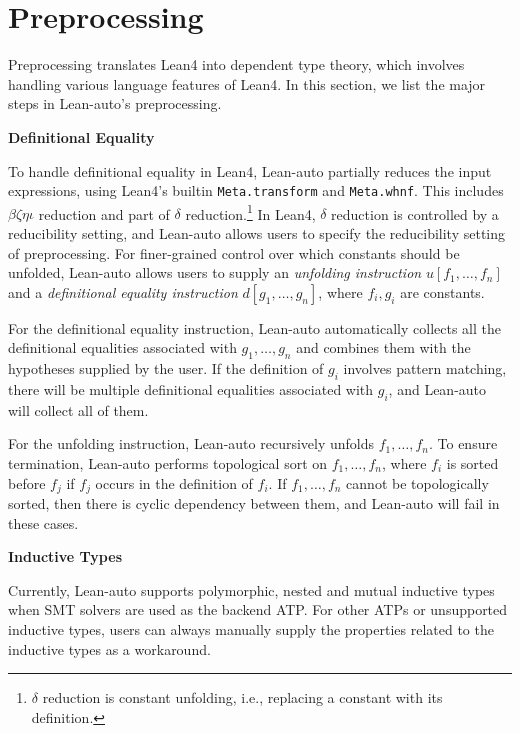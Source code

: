 \section{Preprocessing}\label{sectprep}

  Preprocessing translates Lean4 into dependent type theory, which involves
  handling various language features of Lean4. In this section, we list the major steps
  in Lean-auto's preprocessing.


\noindent \textbf{Definitional Equality}

  To handle definitional equality in Lean4, Lean-auto partially reduces the input
  expressions, using Lean4's builtin \texttt{Meta.transform} and \texttt{Meta.whnf}.
  This includes $\beta \zeta \eta \iota$ reduction and part of $\delta$
  reduction.\footnote{$\delta$ reduction is constant unfolding, i.e., replacing a constant with its definition.}
  In Lean4, $\delta$ reduction is controlled by a reducibility setting,
  and Lean-auto allows users to specify the reducibility setting of preprocessing.
  For finer-grained control over which constants should be unfolded, Lean-auto allows
  users to supply an \textit{unfolding instruction} $u[f_1, \dots, f_n]$ and a
  \textit{definitional equality instruction} $d[g_1, \dots, g_n]$, where $f_i, g_i$
  are constants.

  For the definitional equality instruction, Lean-auto automatically collects all the definitional
  equalities associated with $g_1, \dots, g_n$ and combines them with the hypotheses
  supplied by the user. If the definition of $g_i$ involves pattern matching,
  there will be multiple definitional equalities associated with $g_i$, and Lean-auto
  will collect all of them.

  For the unfolding instruction, Lean-auto recursively unfolds $f_1, \dots, f_n$.
  To ensure termination, Lean-auto performs topological sort on $f_1, \dots, f_n$,
  where $f_i$ is sorted before $f_j$ if $f_j$ occurs in the definition of $f_i$. If
  $f_1, \dots, f_n$ cannot be topologically sorted, then there is cyclic dependency
  between them, and Lean-auto will fail in these cases.

\noindent \textbf{Inductive Types}

  Currently, Lean-auto supports polymorphic, nested and mutual inductive types
  when SMT solvers are used as the backend ATP. For other ATPs or unsupported
  inductive types, users can always manually supply the properties related
  to the inductive types as a workaround.

